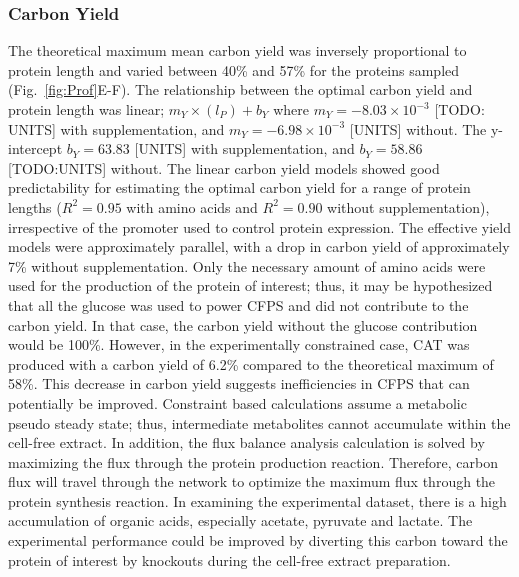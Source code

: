 \documentclass[journal=asbcd6,manuscript=article]{achemso}
\begin{document}
\subsubsection{Carbon Yield}
The theoretical maximum mean carbon yield was inversely proportional to protein length and varied between 40\% and 57\% for the proteins sampled (Fig.~\ref{fig:Prof}E-F).
The relationship between the optimal carbon yield and protein length was linear; $m_{Y}\times(l_{P})+b_{Y}$ where $m_{Y} =  -8.03\times10^{-3}$ [TODO: UNITS] with supplementation, and $m_{Y} = -6.98\times10^{-3}$ [UNITS] without. The y-intercept $b_{Y} = 63.83$ [UNITS] with supplementation, and $b_{Y} = 58.86$ [TODO:UNITS] without.
The linear carbon yield models showed good predictability for estimating the optimal carbon yield for a range of protein lengths ($R^{2} = 0.95$ with amino acids
and $R^{2} = 0.90$ without supplementation), irrespective of the promoter used to control protein expression.
The effective yield models were approximately parallel, with a drop in carbon yield of approximately 7\% without supplementation.
Only the necessary amount of amino acids were used for the production of the protein of interest; thus, it may be hypothesized that all the glucose was used to power CFPS and did not contribute to the carbon yield.
In that case, the carbon yield without the glucose contribution would be 100\%.
However, in the experimentally constrained case, CAT was produced with a carbon yield of 6.2\% compared to the theoretical maximum of 58\%.
This decrease in carbon yield suggests inefficiencies in CFPS that can potentially be improved.
Constraint based calculations assume a metabolic pseudo steady state; thus, intermediate metabolites cannot accumulate within the cell-free extract.
In addition, the flux balance analysis calculation is solved by maximizing the flux through the protein production reaction.
Therefore, carbon flux will travel through the network to optimize the maximum flux through the protein synthesis reaction.
In examining the experimental dataset, there is a high accumulation of organic acids, especially acetate, pyruvate and lactate.
The experimental performance could be improved by diverting this carbon toward the protein of interest by knockouts during the cell-free extract preparation.
\end{document}
